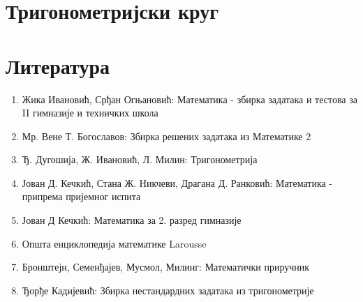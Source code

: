 \documentclass[a4paper,12pt]{article}
\begin{document}

% 


\section{Тригонометријски круг}



\section{Литература}

\begin{enumerate}
\item Жика Ивановић, Срђан Огњановић: Математика - збирка задатака и тестова за II гимназије и техничких школа
\item Мр. Вене Т. Богославов: Збирка решених задатака из Математике 2
\item Ђ. Дугошија, Ж. Ивановић, Л. Милин: Тригонометрија
\item Јован Д. Кечкић, Стана Ж. Никчеви, Драгана Д. Ранковић: Математика - припрема пријемног испита
\item Јован Д Кечкић: Математика за 2. разред гимназије
\item Општа енциклопедија математике Larousse
\item Бронштејн, Семенђајев, Мусмол, Милинг: Математички приручник
\item Ђорђе Кадијевић: Збирка нестандардних задатака из тригонометрије
\end{enumerate}
\end{document}
